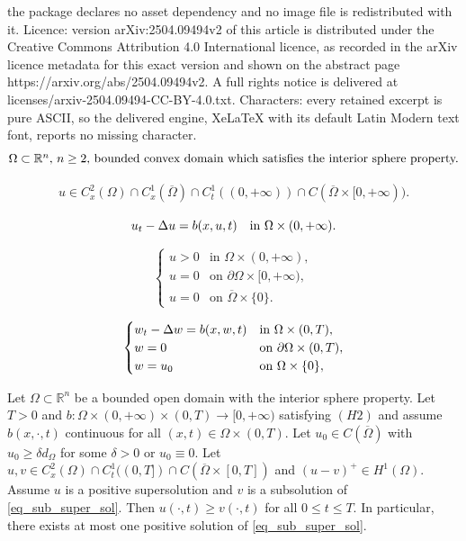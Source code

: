 \documentclass[10pt,a4paper]{amsart}
\newcommand{\Omegabar}{\overline{\Omega}}
\newcommand{\R}{\mathbb{R}}
\begin{document}
the package declares no asset dependency and no image file is redistributed with it. Licence: version arXiv:2504.09494v2 of this article is distributed under the Creative Commons Attribution 4.0 International licence, as recorded in the arXiv licence metadata for this exact version and shown on the abstract page https://arxiv.org/abs/2504.09494v2. A full rights notice is delivered at licenses/arxiv-2504.09494-CC-BY-4.0.txt. Characters: every retained excerpt is pure ASCII, so the delivered engine, XeLaTeX with its default Latin Modern text font, reports no missing character.
	\begin{equation}\label{eq_ipost_domain}
	\hbox{$\Omega \subset \R^n$, $n\geq 2$, bounded convex domain which satisfies the interior sphere property.}
	\end{equation}

	\begin{align}\label{regularity conditions}
	u\in C^2_x(\Omega)\cap C^1_x(\Omegabar)\cap C^1_t((0,+\infty))\cap C(\Omegabar\times[0,+\infty)).
	\end{align} 

	\begin{equation}\label{eq_general_bxu}
	u_t-\Delta u=b(x,u, t) \quad\hbox{in }\Omega\times (0,+\infty).
	\end{equation}

	\begin{equation}\label{boundary and initial conditions}
		\begin{cases}
				u>0 & \text{in } \Omega\times (0,+\infty),\\
					u=0 & \text{on }\partial \Omega\times [0,+\infty),	 \\
					u =0 & \text{on } \Omegabar \times \{0\}. 
		\end{cases}
	\end{equation}

\begin{equation} \label{eq_sub_super_sol}
		\begin{cases}
			w_t-\Delta w = b(x,w,t)&\hbox{in }\Omega\times(0,T),\\
			w=0 &\hbox{on } \partial \Omega\times(0,T),\\
			w=u_0&\hbox{on } \Omega \times \{0\},
		\end{cases}
	\end{equation}

\begin{proposition}
\label{comparison principle dickstein} 
Let $\Omega \subset \R^n$ be a bounded open domain with the interior sphere property. 
Let $T>0$ and $b\colon\Omega\times(0,+\infty) \times (0,T)\to [0,+\infty)$ satisfying \hyperlink{H2}{\( (H2) \)} and assume $b(x,\cdot,t)$ continuous for all $(x,t)\in \Omega\times(0,T)$.
	Let $u_0\in C(\Omegabar)$ with $u_0\geq \delta d_\Omega$ for some $\delta>0$ or $u_0\equiv 0$. 
	Let $u,v\in C^2_x(\Omega)\cap C^1_t((0,T])\cap C(\Omegabar\times[0,T])$ and $(u-v)^+\in H^1(\Omega)$.
	Assume $u$ is a positive supersolution and $v$ is a subsolution of \eqref{eq_sub_super_sol}.
Then $u(\cdot,t)\geq v(\cdot,t)$ for all $0\leq t\leq T$. 
In particular, there exists at most one positive solution of \eqref{eq_sub_super_sol}.
\end{proposition}
\end{document}
